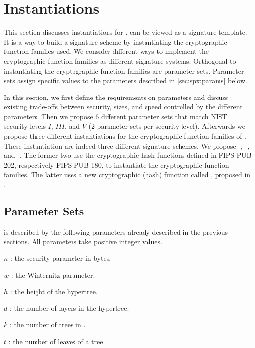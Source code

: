\section{Instantiations}
\label{sec:instantiations}

This section discusses instantiations for \spx. \spx can be
viewed as a signature template. It is a way to build a signature
scheme by instantiating the cryptographic function families used. We consider
different ways to implement the cryptographic function families as
different signature systems. Orthogonal to instantiating the cryptographic
function families are parameter sets. Parameter sets
assign  specific values to the \spx parameters described in \autoref{sec:spx:params} below.

In this section, we first define the requirements on parameters and discuss
existing trade-offs between
security, sizes, and speed controlled by the different parameters. Then we
propose 6 different parameter sets that match NIST security levels $I$,
$III$, and $V$ (2 parameter sets per security level). Afterwards we propose
three different instantiations for the cryptographic function families of \spx.
These instantiation are indeed three different signature schemes. We propose
\spx-\shathree, \spx-\shatwo, and \spx-\haraka. The
former two use the cryptographic hash functions defined in FIPS PUB 202,
respectively FIPS PUB 180, to instantiate the cryptographic function families.
The latter uses a new cryptographic (hash) function called \haraka, proposed in
\cite{articleToSC563}.

\subsection{\spx Parameter Sets}\label{sec:spx:params}
\spx is described by the following parameters already described in the previous
sections. All parameters take positive integer values.
\begin{description}
 \item  $n$ : the security parameter in bytes.
 \item  $w$ : the Winternitz parameter.
 \item  $h$ : the height of the hypertree.
 \item  $d$ : the number of layers in the hypertree.
 \item  $k$ : the number of trees in \fors.
 \item  $t$ : the number of leaves of a \fors tree.
\end{description}

